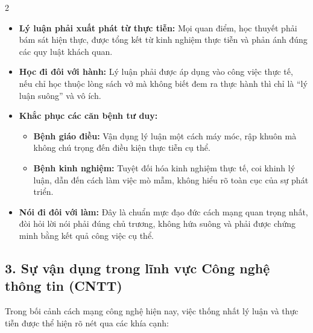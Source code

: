 \documentclass[9pt,a4paper]{extarticle}
\begin{document}
\begin{multicols*}{2}
\begin{itemize}
\item \textbf{Lý luận phải xuất phát từ thực tiễn:} Mọi quan điểm, học thuyết phải bám sát hiện thực, được tổng kết từ kinh nghiệm thực tiễn và phản ánh đúng các quy luật khách quan.
\item \textbf{Học đi đôi với hành:} Lý luận phải được áp dụng vào công việc thực tế, nếu chỉ học thuộc lòng sách vở mà không biết đem ra thực hành thì chỉ là ``lý luận suông'' và vô ích.
\item \textbf{Khắc phục các căn bệnh tư duy:}
  \begin{itemize}
  \item \textbf{Bệnh giáo điều:} Vận dụng lý luận một cách máy móc, rập khuôn mà không chú trọng đến điều kiện thực tiễn cụ thể.
  \item \textbf{Bệnh kinh nghiệm:} Tuyệt đối hóa kinh nghiệm thực tế, coi khinh lý luận, dẫn đến cách làm việc mò mẫm, không hiểu rõ toàn cục của sự phát triển.
  \end{itemize}
\item \textbf{Nói đi đôi với làm:} Đây là chuẩn mực đạo đức cách mạng quan trọng nhất, đòi hỏi lời nói phải đúng chủ trương, không hứa suông và phải được chứng minh bằng kết quả công việc cụ thể.
\end{itemize}

\subsection*{3. Sự vận dụng trong lĩnh vực Công nghệ thông tin (CNTT)}

Trong bối cảnh cách mạng công nghệ hiện nay, việc thống nhất lý luận và thực tiễn được thể hiện rõ nét qua các khía cạnh:


\end{multicols*}
\end{document}
